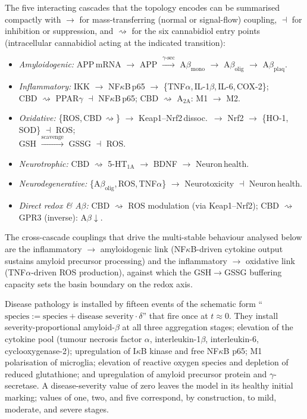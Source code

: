 \documentclass[10pt,letterpaper]{article}
\begin{document}
The five interacting cascades that the topology encodes can be summarised compactly with $\to$ for mass-transferring (normal or signal-flow) coupling, $\dashv$ for inhibition or suppression, and $\rightsquigarrow$ for the six cannabidiol entry points (intracellular cannabidiol acting at the indicated transition):
\begin{itemize}\setlength{\itemsep}{2pt}
\item \textit{Amyloidogenic:} APP\,mRNA $\to$ APP $\xrightarrow{\gamma\text{-sec}}$ A$\beta_{\text{mono}}$ $\to$ A$\beta_{\text{olig}}$ $\to$ A$\beta_{\text{plaq}}$.
\item \textit{Inflammatory:} IKK $\to$ NF$\kappa$B\,p65 $\to$ \{TNF$\alpha$,\,IL-1$\beta$,\,IL-6,\,COX-2\}; \\ CBD $\rightsquigarrow$ PPAR$\gamma$ $\dashv$ NF$\kappa$B\,p65;\; CBD $\rightsquigarrow$ A$_{2\text{A}}$: M1 $\to$ M2.
\item \textit{Oxidative:} \{ROS,\,CBD\,$\rightsquigarrow$\} $\to$ Keap1--Nrf2\,dissoc.\ $\to$ Nrf2 $\to$ \{HO-1,\,SOD\} $\dashv$ ROS; \\ GSH $\xrightarrow{\text{scavenge}}$ GSSG $\dashv$ ROS.
\item \textit{Neurotrophic:} CBD $\rightsquigarrow$ 5-HT$_{1\text{A}}$ $\to$ BDNF $\to$ Neuron\,health.
\item \textit{Neurodegenerative:} \{A$\beta_{\text{olig}}$,\,ROS,\,TNF$\alpha$\} $\to$ Neurotoxicity $\dashv$ Neuron\,health.
\item \textit{Direct redox \& A$\beta$:} CBD $\rightsquigarrow$ ROS modulation (via Keap1--Nrf2);\; CBD $\rightsquigarrow$ GPR3 (inverse): A$\beta\downarrow$.
\end{itemize}
The cross-cascade couplings that drive the multi-stable behaviour analysed below are the inflammatory $\to$ amyloidogenic link (NF$\kappa$B-driven cytokine output sustains amyloid precursor processing) and the inflammatory $\to$ oxidative link (TNF$\alpha$-driven ROS production), against which the GSH$\to$GSSG buffering capacity sets the basin boundary on the redox axis.

Disease pathology is installed by fifteen events of the schematic form ``$\text{species} := \text{species} + \text{disease severity} \cdot \delta$'' that fire once at $t \approx 0$. They install severity-proportional amyloid-$\beta$ at all three aggregation stages; elevation of the cytokine pool (tumour necrosis factor $\alpha$, interleukin-1$\beta$, interleukin-6, cyclooxygenase-2); upregulation of I$\kappa$B kinase and free NF$\kappa$B p65; M1 polarisation of microglia; elevation of reactive oxygen species and depletion of reduced glutathione; and upregulation of amyloid precursor protein and $\gamma$-secretase. A disease-severity value of zero leaves the model in its healthy initial marking; values of one, two, and five correspond, by construction, to mild, moderate, and severe stages.
\end{document}
